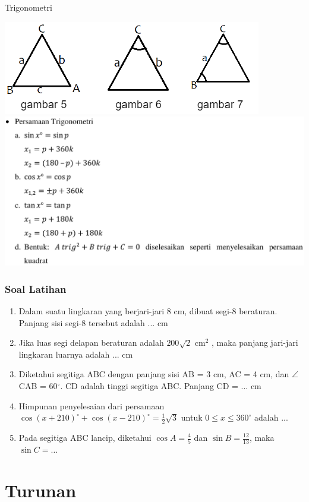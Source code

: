 \documentclass[pdflatex,compress,mathserif]{beamer}
\begin{document}
	\begin{frame}{Trigonometri}
		\begin{center}
			\includegraphics[width=0.5\linewidth]{pict/26}
			\includegraphics[width=0.9\linewidth]{pict/33}
		\end{center}
	\end{frame}

	\begin{frame}
		\frametitle{Soal Latihan}
		\begin{enumerate}
			\item Dalam suatu lingkaran yang berjari-jari 8 cm, dibuat segi-8 beraturan. Panjang sisi segi-8 tersebut adalah ... cm
			\item  Jika luas segi delapan beraturan adalah $ 200\sqrt{2}\text{ cm}^2 $ , maka panjang jari-jari lingkaran luarnya adalah ... cm
			\item Diketahui segitiga ABC dengan panjang sisi AB = 3 cm, AC = 4 cm, dan $ \angle $CAB = 60$ ^{\circ} $. CD adalah tinggi segitiga ABC. Panjang CD = ... cm
			\item Himpunan penyelesaian dari persamaan $ \cos(x + 210)^{\circ} + \cos(x - 210)^{\circ} = \frac{1}{2}\sqrt{3} $ untuk $ 0 \leq x \leq 360^{\circ} $ adalah ... 
			\item Pada segitiga ABC lancip, diketahui $ \cos A = \frac{4}{5} $ dan $ \sin B = \frac{12}{13} $, maka $ \sin C = \ldots $
		\end{enumerate}
	\end{frame}

\section{Turunan}
\end{document}
